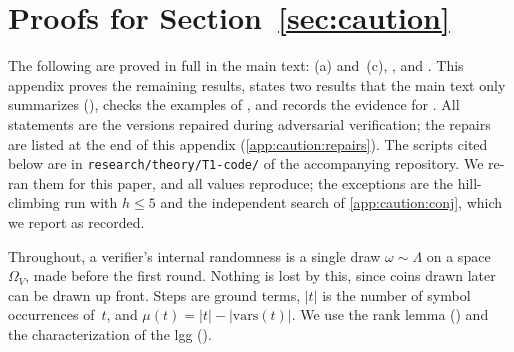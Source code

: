 \providecommand{\ACCEPT}{\textsf{ACCEPT}}
\providecommand{\REJECT}{\textsf{REJECT}}
\providecommand{\ESCALATE}{\textsf{ESCALATE}}
\providecommand{\vars}{\mathrm{vars}}
\providecommand{\Bell}{\mathrm{Bell}}
\providecommand{\ccl}{\mathrm{cl}}
\providecommand{\Htag}[1]{H^{\mathrm{tag}}_{#1}}
\providecommand{\nesc}{\#\mathrm{ESC}}

\section{Proofs for Section~\ref{sec:caution}}\label{app:caution}

The following are proved in full in the main text: (a) and~(c), ,  and . This appendix proves the remaining results, states two results that the main text only summarizes (), checks the examples of , and records the evidence for . All statements are the versions repaired during adversarial verification; the repairs are listed at the end of this appendix (\cref{app:caution:repairs}). The scripts cited below are in \texttt{research/theory/T1-code/} of the accompanying repository. We re-ran them for this paper, and all values reproduce; the exceptions are the hill-climbing run with $h\le5$ and the independent search of \cref{app:caution:conj}, which we report as recorded.

Throughout, a verifier's internal randomness is a single draw $\omega\sim\Lambda$ on a space~$\Omega_V$, made before the first round. Nothing is lost by this, since coins drawn later can be drawn up front. Steps are ground terms, $|t|$ is the number of symbol occurrences of~$t$, and $\mu(t)=|t|-|\vars(t)|$. We use the rank lemma () and the characterization of the lgg ().

